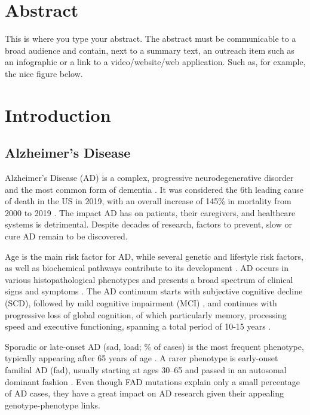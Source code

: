 \documentclass{amsart}
\newcommand{\mainmatter}{
    \newpage
    \pagenumbering{arabic}  %
}
\begin{document}
\newpage
\section*{Abstract}
This is where you type your abstract.
The abstract must be communicable to a broad audience and contain, next to a summary text, an outreach item such as an infographic or a link to a video/website/web application.
Such as, for example, the nice figure below.


\clearpage
\printacronyms[title = Abbreviations, toctitle = Abbreviations]

\newpage
\tableofcontents

\mainmatter

\newpage
\section{Introduction}\label{Intro}
\subsection{Alzheimer’s Disease}
Alzheimer’s Disease (AD) is a complex, progressive neurodegenerative disorder and the most common form of dementia \cite{Penke2023NewDisease}. It was considered the 6th leading cause of death in the US in 2019, with an overall increase of 145\% in mortality from 2000 to 2019 \cite{20232023Figures}. The impact AD has on patients, their caregivers, and healthcare systems is detrimental. Despite decades of research, factors to prevent, slow or cure AD remain to be discovered.

Age is the main risk factor for AD, while several genetic and lifestyle risk factors, as well as biochemical pathways contribute to its development \cite{Penke2023NewDisease}. AD occurs in various histopathological phenotypes and presents a broad spectrum of clinical signs and symptoms \cite{Heneka2015NeuroinflammationDisease, Edwards2019ANeurodegeneration}. The AD continuum starts with subjective cognitive decline (SCD), followed by mild cognitive impairment (MCI) \cite{Rasmussen2019AlzheimersDiagnosis}, and continues with progressive loss of global cognition, of which particularly memory, processing speed and executive functioning, spanning a total period of 10-15 years \cite{Scheltens2016AlzheimersDisease}. 

Sporadic or late-onset AD (\acrshort{sad}, \acrshort{load}; \% of cases) is the most frequent phenotype, typically appearing after 65 years of age \cite{Beydoun2014EpidemiologicMeta-analysis}. A rarer phenotype is early-onset familial AD (\acrshort{fad}), usually starting at ages 30–65 and passed in an autosomal dominant fashion \cite{VanCauwenberghe2015ThePerspectives}.
Even though FAD mutations explain only a small percentage of AD cases, they have a great impact on AD research given their appealing genotype-phenotype links.
\end{document}
